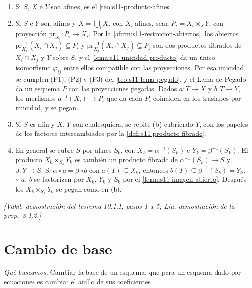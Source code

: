 \begin{obs}
\label{obs:s11-pasos-existencia}
\begin{enumerate}[label=(\alph*)]
\item Si \(S\), \(X\) e \(Y\) son afines, es el \cref{teo:s11-producto-afines}.
\item Si \(S\) e \(Y\) son afines y \(X=\bigcup_i X_i\) con \(X_i\) afines, sean \(P_i=X_i\times_S Y\), con proyección \(\mathrm{pr}_{X_i}\colon P_i\to X_i\). Por la \cref{afirm:s11-restrccion-abiertos}, los abiertos \(\mathrm{pr}_{X_i}^{-1}(X_i\cap X_j)\subseteq P_i\) y \(\mathrm{pr}_{X_j}^{-1}(X_i\cap X_j)\subseteq P_j\) son dos productos fibrados de \(X_i\cap X_j\) y \(Y\) sobre \(S\), y el \cref{lema:s11-unicidad-producto} da un único isomorfismo \(\varphi_{ij}\) entre ellos compatible con las proyecciones. Por esa unicidad se cumplen (P1), (P2) y (P3) del \cref{teo:s11-lema-pegado}, y el Lema de Pegado da un esquema \(P\) con las proyecciones pegadas. Dados \(a\colon T\to X\) y \(b\colon T\to Y\), los morfismos \(a^{-1}(X_i)\to P_i\) que da cada \(P_i\) coinciden en los traslapes por unicidad, y se pegan.
\item Si \(S\) es afín y \(X\), \(Y\) son cualesquiera, se repite (b) cubriendo \(Y\), con los papeles de los factores intercambiados por la \cref{defi:s11-producto-fibrado}.
\item En general se cubre \(S\) por afines \(S_k\), con \(X_k=\alpha^{-1}(S_k)\) e \(Y_k=\beta^{-1}(S_k)\). El producto \(X_k\times_{S_k}Y_k\) es también un producto fibrado de \(\alpha^{-1}(S_k)\to S\) y \(\beta\colon Y\to S\). Si \(\alpha\circ a=\beta\circ b\) con \(a(T)\subseteq X_k\), entonces \(b(T)\subseteq\beta^{-1}(S_k)=Y_k\), y \(a\), \(b\) se factorizan por \(X_k\), \(Y_k\) y \(S_k\) por el \cref{lema:s11-imagen-abierto}. Después los \(X_k\times_{S_k}Y_k\) se pegan como en (b).
\end{enumerate}
\emph{[Vakil, demostración del teorema 10.1.1, pasos 1 a 5; Liu, demostración de la prop.~3.1.2.]}
\end{obs}

\section{Cambio de base}
\label{sec:s11-cambio-base}

\emph{Qué buscamos.} Cambiar la base de un esquema, que para un esquema dado por ecuaciones es cambiar el anillo de sus coeficientes.

